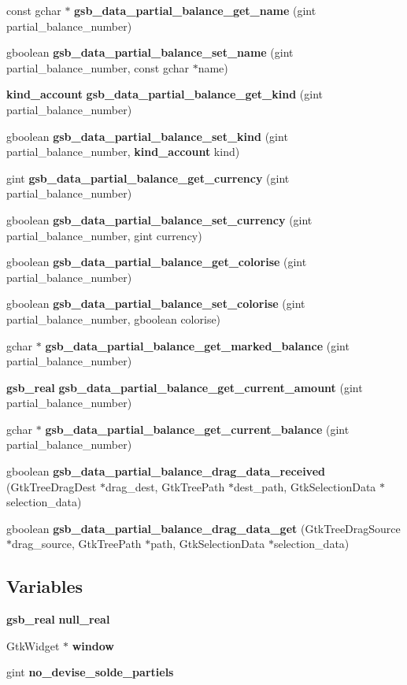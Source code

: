 \begin{DoxyCompactItemize}
\item 
const gchar $\ast$ {\bf gsb\_\-data\_\-partial\_\-balance\_\-get\_\-name} (gint partial\_\-balance\_\-number)
\item 
gboolean {\bf gsb\_\-data\_\-partial\_\-balance\_\-set\_\-name} (gint partial\_\-balance\_\-number, const gchar $\ast$name)
\item 
{\bf kind\_\-account} {\bf gsb\_\-data\_\-partial\_\-balance\_\-get\_\-kind} (gint partial\_\-balance\_\-number)
\item 
gboolean {\bf gsb\_\-data\_\-partial\_\-balance\_\-set\_\-kind} (gint partial\_\-balance\_\-number, {\bf kind\_\-account} kind)
\item 
gint {\bf gsb\_\-data\_\-partial\_\-balance\_\-get\_\-currency} (gint partial\_\-balance\_\-number)
\item 
gboolean {\bf gsb\_\-data\_\-partial\_\-balance\_\-set\_\-currency} (gint partial\_\-balance\_\-number, gint currency)
\item 
gboolean {\bf gsb\_\-data\_\-partial\_\-balance\_\-get\_\-colorise} (gint partial\_\-balance\_\-number)
\item 
gboolean {\bf gsb\_\-data\_\-partial\_\-balance\_\-set\_\-colorise} (gint partial\_\-balance\_\-number, gboolean colorise)
\item 
gchar $\ast$ {\bf gsb\_\-data\_\-partial\_\-balance\_\-get\_\-marked\_\-balance} (gint partial\_\-balance\_\-number)
\item 
{\bf gsb\_\-real} {\bf gsb\_\-data\_\-partial\_\-balance\_\-get\_\-current\_\-amount} (gint partial\_\-balance\_\-number)
\item 
gchar $\ast$ {\bf gsb\_\-data\_\-partial\_\-balance\_\-get\_\-current\_\-balance} (gint partial\_\-balance\_\-number)
\item 
gboolean {\bf gsb\_\-data\_\-partial\_\-balance\_\-drag\_\-data\_\-received} (GtkTreeDragDest $\ast$drag\_\-dest, GtkTreePath $\ast$dest\_\-path, GtkSelectionData $\ast$selection\_\-data)
\item 
gboolean {\bf gsb\_\-data\_\-partial\_\-balance\_\-drag\_\-data\_\-get} (GtkTreeDragSource $\ast$drag\_\-source, GtkTreePath $\ast$path, GtkSelectionData $\ast$selection\_\-data)
\end{DoxyCompactItemize}
\subsection*{Variables}
\begin{DoxyCompactItemize}
\item 
{\bf gsb\_\-real} {\bf null\_\-real}
\item 
GtkWidget $\ast$ {\bf window}
\item 
gint {\bf no\_\-devise\_\-solde\_\-partiels}
\end{DoxyCompactItemize}



